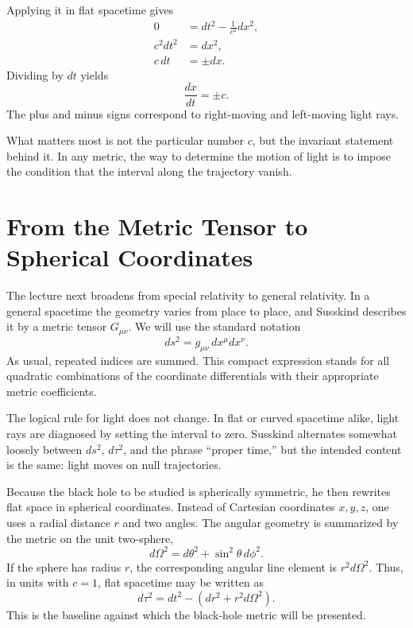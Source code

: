 Applying it in flat spacetime gives
\begin{align}
0 &= dt^2 - \frac{1}{c^2}dx^2,\\
c^2dt^2 &= dx^2,\\
c\,dt &= \pm dx.
\end{align}
Dividing by \(dt\) yields
\begin{equation}
\frac{dx}{dt}=\pm c.
\end{equation}
The plus and minus signs correspond to right-moving and left-moving light rays.

What matters most is not the particular number \(c\), but the invariant statement behind it. In any metric, the way to determine the motion of light is to impose the condition that the interval along the trajectory vanish.

\section{From the Metric Tensor to Spherical Coordinates}

The lecture next broadens from special relativity to general relativity. In a general spacetime the geometry varies from place to place, and Susskind describes it by a metric tensor \(G_{\mu\nu}\). We will use the standard notation
\begin{equation}
ds^2 = g_{\mu\nu}\,dx^\mu dx^\nu.
\end{equation}
As usual, repeated indices are summed. This compact expression stands for all quadratic combinations of the coordinate differentials with their appropriate metric coefficients.

The logical rule for light does not change. In flat or curved spacetime alike, light rays are diagnosed by setting the interval to zero. Susskind alternates somewhat loosely between \(ds^2\), \(d\tau^2\), and the phrase ``proper time,'' but the intended content is the same: light moves on null trajectories.

Because the black hole to be studied is spherically symmetric, he then rewrites flat space in spherical coordinates. Instead of Cartesian coordinates \(x,y,z\), one uses a radial distance \(r\) and two angles. The angular geometry is summarized by the metric on the unit two-sphere,
\begin{equation}
d\Omega^2 = d\theta^2 + \sin^2\theta\,d\phi^2.
\end{equation}
If the sphere has radius \(r\), the corresponding angular line element is \(r^2d\Omega^2\). Thus, in units with \(c=1\), flat spacetime may be written as
\begin{equation}
d\tau^2 = dt^2 - \left(dr^2 + r^2 d\Omega^2\right).
\end{equation}
This is the baseline against which the black-hole metric will be presented.

